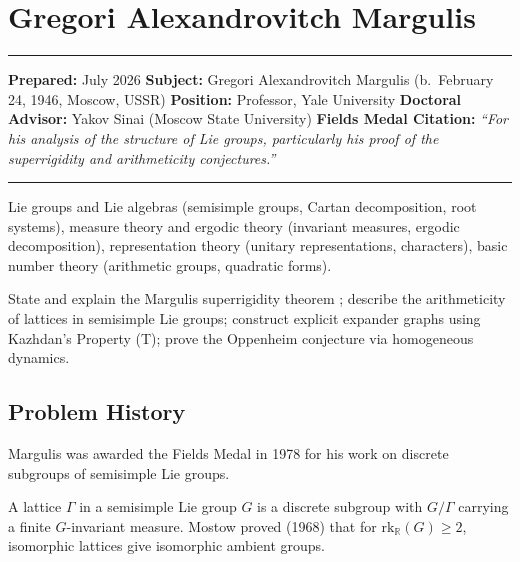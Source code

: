 \chapter{Gregori Alexandrovitch Margulis}\label{ch1978gregorialexandrovitchmargulis:gregori-alexandrovitch-margulis-fields-medal-1978}

\begin{center}\rule{0.5\linewidth}{0.5pt}\end{center}

\textbf{Prepared:} July 2026 \textbf{Subject:} Gregori Alexandrovitch
Margulis (b.~February 24, 1946, Moscow, USSR) \textbf{Position:}
Professor, Yale University \textbf{Doctoral Advisor:} Yakov Sinai
(Moscow State University) \textbf{Fields Medal Citation:} \emph{``For his
analysis of the structure of Lie groups, particularly his proof of the
superrigidity and arithmeticity conjectures.''}

\begin{center}\rule{0.5\linewidth}{0.5pt}\end{center}

\begin{prereqs} Lie groups and Lie algebras (semisimple groups,
Cartan decomposition, root systems), measure theory and ergodic theory
(invariant measures, ergodic decomposition), representation theory
(unitary representations, characters), basic number theory (arithmetic
groups, quadratic forms). \end{prereqs}

\begin{objectives} State and explain the Margulis superrigidity theorem \cite{margulis1991};
describe the arithmeticity of lattices in semisimple Lie groups; construct
explicit expander graphs using Kazhdan's Property (T); prove the
Oppenheim conjecture via homogeneous dynamics.
\end{objectives}

\section{Problem History}

Margulis was awarded the Fields Medal in 1978 for his work on discrete
subgroups of semisimple Lie groups.

A lattice $\Gamma$ in a semisimple Lie group $G$ is a discrete subgroup
with $G/\Gamma$ carrying a finite $G$-invariant measure. Mostow proved
(1968) that for $\mathrm{rk}_{\mathbb{R}}(G) \ge 2$, isomorphic
lattices give isomorphic ambient groups.

